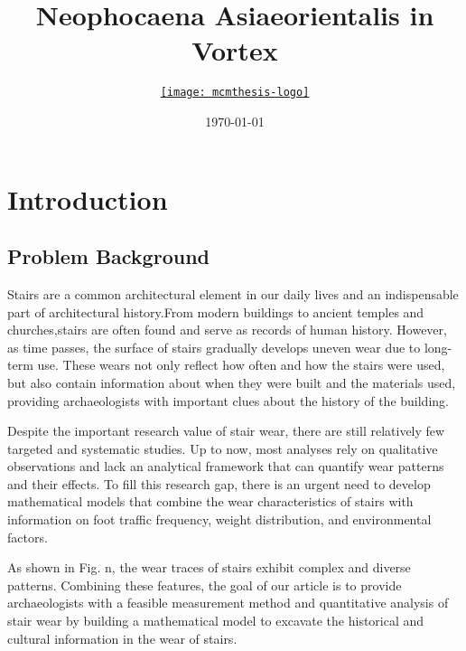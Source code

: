 \documentclass{mcmthesis}
\title{Neophocaena Asiaeorientalis in Vortex}
\author{\small \href{https://www.latexstudio.net/}
  {\texttt{[image: mcmthesis-logo]}}}
\date{\today}
\let\oldtableofcontents\tableofcontents
\renewcommand{\tableofcontents}{%
          \begingroup
          \setstretch{0.1} %
          \oldtableofcontents
          \endgroup
        }
\begin{document}
\begin{abstract}%
    \par       
\begin{keywords}%
               
\end{keywords}
\end{abstract}   

\maketitle
\newpage
\pagestyle{main}
\setcounter{page}{2} %
\tableofcontents

\newpage
\section{Introduction}
\subsection{Problem Background}

Stairs are a common architectural element in our daily lives and an indispensable part of architectural history.From modern buildings to ancient temples and churches,stairs are often found and serve as records of human history. However, as time passes, the surface of stairs gradually develops uneven wear due to long-term use. These wears not only reflect how often and how the stairs were used, but also contain information about when they were built and the materials used, providing archaeologists with important clues about the history of the building.

Despite the important research value of stair wear, there are still relatively few targeted and systematic studies. Up to now, most analyses rely on qualitative observations and lack an analytical framework that can quantify wear patterns and their effects. To fill this research gap, there is an urgent need to develop mathematical models that combine the wear characteristics of stairs with information on foot traffic frequency, weight distribution, and environmental factors.

As shown in Fig. n, the wear traces of stairs exhibit complex and diverse patterns. Combining these features, the goal of our article is to provide archaeologists with a feasible measurement method and quantitative analysis of stair wear by building a mathematical model to excavate the historical and cultural information in the wear of stairs.
\end{document}
